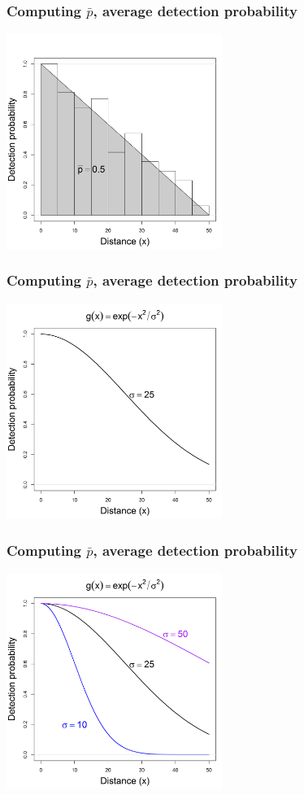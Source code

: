 \documentclass[color=usenames,dvipsnames]{beamer}\usepackage[]{graphicx}\usepackage[]{color}
\begin{document}
\begin{frame}
  \frametitle{Computing $\bar{p}$, average detection probability}
\begin{center}
  \includegraphics[width=7cm]{figs/detfun0-3}
\end{center}
\end{frame}




\begin{frame}
  \frametitle{Computing $\bar{p}$, average detection probability}
\begin{center}
  \includegraphics[width=7cm]{figs/detfun1}
\end{center}
\end{frame}




\begin{frame}
  \frametitle{Computing $\bar{p}$, average detection probability}
\begin{center}
  \includegraphics[width=7cm]{figs/detfun2}
\end{center}
\end{frame}
\end{document}
